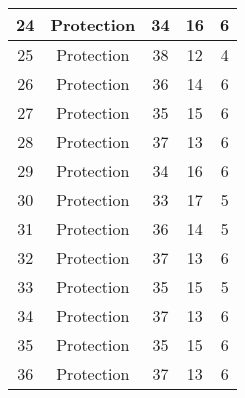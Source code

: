 \documentclass[results.tex]{subfiles}
\begin{document}
\begin{center}
\begin{tabular}{| c || c | c | c | c |}
            \hline
            24                      & Protection                   & 34                     & 16                      & 6                    \\
            \hline
            25                      & Protection                   & 38                     & 12                      & 4                    \\
            \hline
            26                      & Protection                   & 36                     & 14                      & 6                    \\
            \hline
            27                      & Protection                   & 35                     & 15                      & 6                    \\
            \hline
            28                      & Protection                   & 37                     & 13                      & 6                    \\
            \hline
            29                      & Protection                   & 34                     & 16                      & 6                    \\
            \hline
            30                      & Protection                   & 33                     & 17                      & 5                    \\
            \hline
            31                      & Protection                   & 36                     & 14                      & 5                    \\
            \hline
            32                      & Protection                   & 37                     & 13                      & 6                    \\
            \hline
            33                      & Protection                   & 35                     & 15                      & 5                    \\
            \hline
            34                      & Protection                   & 37                     & 13                      & 6                    \\
            \hline
            35                      & Protection                   & 35                     & 15                      & 6                    \\
            \hline
            36                      & Protection                   & 37                     & 13                      & 6                    \\

\end{tabular}
\end{center}
\end{document}
